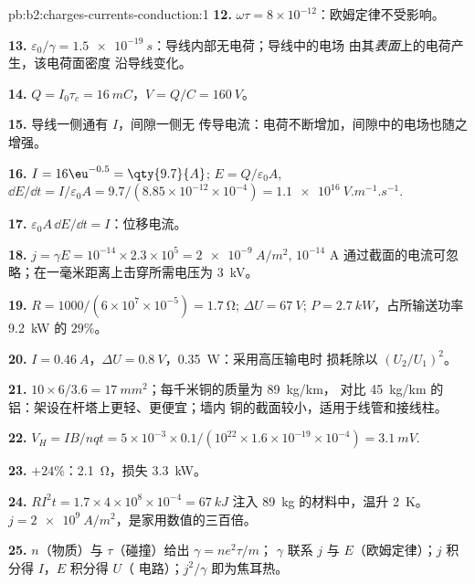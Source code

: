 \begin{solution}{pb:b2:charges-currents-conduction:1}
\textbf{12.} $\omega\tau = 8 \times 10^{-12}$：欧姆定律不受影响。

\textbf{13.} $\varepsilon_0/\gamma = \qty{1.5e-19}{s}$：导线内部无电荷；导线中的电场
由其\emph{表面}上的电荷产生，该电荷面密度
沿导线变化。

\textbf{14.} $Q = I_0\tau_c = \qty{16}{mC}$，$V = Q/C = \qty{160}{V}$。

\textbf{15.} 导线一侧通有 $I$，间隙一侧无
传导电流：电荷不断增加，间隙中的电场也随之增强。

\textbf{16.} $I = 16\eu^{-0.5} = \qty{9.7}{A}$; $E = Q/\varepsilon_0A$, $\dd E/\dd t = I/\varepsilon_0A
= 9.7/(8.85 \times 10^{-12} \times 10^{-4}) = \qty{1.1e16}{V.m^{-1}.s^{-1}}$.

\textbf{17.} $\varepsilon_0A\,\dd E/\dd t = I$：位移电流。

\textbf{18.} $j = \gamma E = 10^{-14} \times 2.3 \times 10^5 = \qty{2e-9}{A/m^2}$, $10^{-14}$ A
通过截面的电流可忽略；在一毫米距离上击穿所需电压为 \qty{3}{kV}。

\textbf{19.} $R = 1000/(6 \times 10^7 \times 10^{-5}) = \qty{1.7}{\ohm}$; $\Delta U = \qty{67}{V}$; $P =
\qty{2.7}{kW}$，占所输送功率 \qty{9.2}{kW} 的 $29\%$。

\textbf{20.} $I = \qty{0.46}{A}$，$\Delta U = \qty{0.8}{V}$，\qty{0.35}{W}：采用高压输电时
损耗除以 $(U_2/U_1)^2$。

\textbf{21.} $10 \times 6/3.6 = \qty{17}{mm^2}$；每千米铜的质量为 \qty{89}{kg/km}，
对比 \qty{45}{kg/km} 的铝：架设在杆塔上更轻、更便宜；墙内
铜的截面较小，适用于线管和接线柱。

\textbf{22.} $V_H = IB/nqt = 5 \times 10^{-3} \times 0.1/(10^{22} \times 1.6 \times 10^{-19} \times 10^{-4}) =
\qty{3.1}{mV}$.

\textbf{23.} $+24\%$：\qty{2.1}{\ohm}，损失 \qty{3.3}{kW}。

\textbf{24.} $RI^2t = 1.7 \times 4 \times 10^8 \times 10^{-4} = \qty{67}{kJ}$ 注入 \qty{89}{kg} 的材料中，温升 \qty{2}{K}。
$j = \qty{2e9}{A/m^2}$，是家用数值的三百倍。

\textbf{25.} $n$（物质）与 $\tau$（碰撞）给出 $\gamma = ne^2\tau/m$；
$\gamma$ 联系 $j$ 与 $E$（欧姆定律）；$j$ 积分得 $I$，$E$ 积分得 $U$（
电路）；$j^2/\gamma$ 即为焦耳热。
\end{solution}
